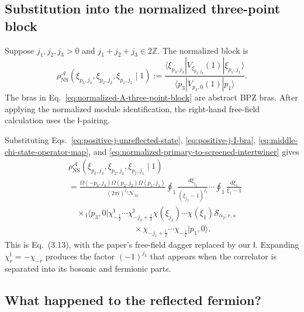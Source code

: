 \documentclass[11pt]{article}
\newcommand{\Ibra}[1]{{}_{\mathsf I}\!\langle #1|}
\begin{document}
\subsection{Substitution into the normalized three-point block}

Suppose \(j_1,j_2,j_3>0\) and
\(j_1+j_2+j_3\in2\mathbb Z\).  The normalized block is
\begin{equation}
 \rho_{\mathrm{NS}}^{\mathcal A}
 \left(
  \xi_{p_3,j_3},
  \xi_{p_2,j_2},
  \xi_{p_1,j_1}
  \mathrel{|}1
 \right)
 :=
 \frac{
  \langle\xi_{p_3,j_3}|
  V_{\xi_{p_2,j_2}}(1)
  |\xi_{p_1,j_1}\rangle
 }{
  \langle p_3|V_{p_2,0}(1)|p_1\rangle
 }.
 \label{eq:normalized-A-three-point-block}
\end{equation}
The bras in Eq.~\eqref{eq:normalized-A-three-point-block} are abstract BPZ
bras.  After applying the normalized module identification, the
right-hand free-field calculation uses the \(\mathsf I\)-pairing.

Substituting Eqs.~\eqref{eq:positive-j-unreflected-state},
\eqref{eq:positive-j-I-bra},
\eqref{eq:middle-chi-state-operator-map}, and
\eqref{eq:normalized-primary-to-screened-intertwiner} gives
\begin{align}
 &\rho_{\mathrm{NS}}^{\mathcal A}
 \left(
  \xi_{p_3,j_3},
  \xi_{p_2,j_2},
  \xi_{p_1,j_1}
  \mathrel{|}1
 \right)
 \nonumber\\
 &=
 \frac{
  \Omega(-p_3,j_3)\Omega(p_2,j_2)\Omega(p_1,j_1)
 }{
  (2\pi i)^{j_2}\mathcal N_{31}
 }
 \oint_{1}\frac{d\xi_{j_2}}{(\xi_{j_2}-1)^{j_2}}
 \cdots
 \oint_{1}\frac{d\xi_1}{\xi_1-1}
 \nonumber\\
 &\quad\times
 \Ibra{p_3,0}
 \chi_{-\frac12}^{\mathsf I}\cdots
 \chi_{-j_3+\frac12}^{\mathsf I}
 \chi(\xi_{j_2})\cdots\chi(\xi_1)
 \mathcal S_{\alpha_2;r,s}
 \nonumber\\
 &\hspace{8em}\times
 \chi_{-j_1+\frac12}\cdots\chi_{-\frac12}
 |p_1,0\rangle.
 \label{eq:3.13-with-I-conjugation}
\end{align}
This is Eq.~(3.13), with the paper's free-field dagger replaced by our
\(\mathsf I\).  Expanding
\(\chi_r^{\mathsf I}=-\chi_{-r}\) produces the factor
\((-1)^{j_3}\) that appears when the correlator is separated into its
bosonic and fermionic parts.

\subsection{What happened to the reflected fermion?}
\end{document}
